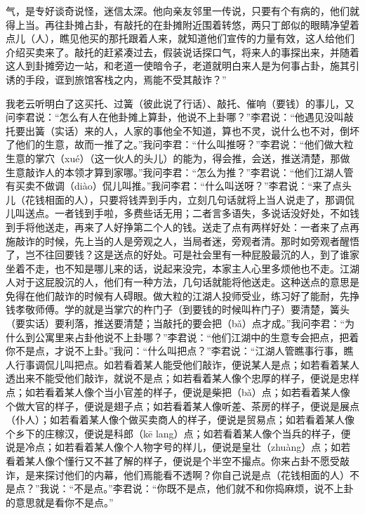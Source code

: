 \documentclass[12pt,UTF8]{ctexbook}
\begin{document}
气，是专好谈奇说怪，迷信太深。他向亲友邻里一传说，只要有个有病的，他们就得上当。再往卦摊占卦，有敲托的在卦摊附近围着转悠，两只丁郎似的眼睛净望着点儿（人），瞧见他买的那托跟着人来，就知道他们宣传的力量有效，这人给他们介绍买卖来了。敲托的赶紧凑过去，假装说话探口气，将来人的事探出来，并随着这人到卦摊旁边一站，和老道一使暗令子，老道就明白来人是为何事占卦，施其引诱的手段，诓到旅馆客栈之内，焉能不受其敲诈？”

我老云听明白了这买托、过簧（彼此说了行话）、敲托、催响（要钱）的事儿，又问李君说：“怎么有人在他卦摊上算卦，他说不上卦哪？”李君说：“他遇见没叫敲托要出簧（实话）来的人，人家的事他全不知道，算也不灵，说什么也不对，倒坏了他们的生意，故而一推了之。”我问李君：“什么叫推呀？”李君说：“他们做大粒生意的掌穴（xué）（这一伙人的头儿）的能为，得会推，会送，推送清楚，那做生意敲诈人的本领才算到家哪。”我问李君：“怎么为推？”李君说：“他们江湖人管有买卖不做调（diào）侃儿叫推。”我问李君：“什么叫送呀？”李君说：“来了点头儿（花钱相面的人），只要将钱弄到手内，立刻几句话就将上当人说走了，那调侃儿叫送点。一者钱到手啦，多费些话无用；二者言多语失，多说话没好处，不如钱到手将他送走，再来了人好挣第二个人的钱。送走了点有两样好处：一者来了点再施敲诈的时候，先上当的人是旁观之人，当局者迷，旁观者清。那时如旁观者醒悟了，岂不往回要钱？这是送点的好处。可是社会里有一种屁股最沉的人，到了谁家坐着不走，也不知是哪儿来的话，说起来没完，本家主人心里多烦他也不走。江湖人对于这屁股沉的人，他们有一种方法，几句话就能将他送走。这种送点的意思是免得在他们敲诈的时候有人碍眼。做大粒的江湖人投师受业，练习好了能耐，先挣钱孝敬师傅。学的就是当掌穴的杵门子（到要钱的时候叫杵门子）要清楚，簧头（要实话）要利落，推送要清楚；当敲托的要会把（bǎ）点才成。”我问李君：“为什么到公寓里来占卦他说不上卦哪？”李君说：“他们江湖中的生意专会把点，把着你不是点，才说不上卦。”我问：“什么叫把点？”李君说：“江湖人管瞧事行事，瞧人行事调侃儿叫把点。如若看着某人能受他们敲诈，便说某人是点；如若看着某人透出来不能受他们敲诈，就说不是点；如若看着某人像个忠厚的样子，便说是忠样点；如若看着某人像个当小官差的样子，便说是柴把（bǎ）点；如若看着某人像个做大官的样子，便说是翅子点；如若看着某人像听差、茶房的样子，便说是展点（仆人）；如若看着某人像个做买卖商人的样子，便说是贸易点；如若看着某人像个乡下的庄稼汉，便说是科郎（kē lang）点；如若看着某人像个当兵的样子，便说是冷点；如若看着某人像个人物字号的样儿，便说是皇壮（zhuàng）点；如若看着某人像个懂行又不甚了解的样子，便说是个半空不撮点。你来占卦不愿受敲诈，是来探讨他们的内幕，他们焉能看不透啊？你自己说是点（花钱相面的人）不是点？”我说：“不是点。”李君说：“你既不是点，他们就不和你捣麻烦，说不上卦的意思就是看你不是点。”
\end{document}
